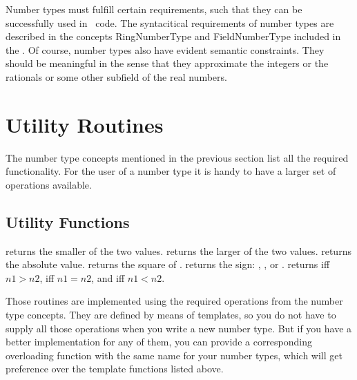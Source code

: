 Number types must fulfill certain requirements, such that they can
be successfully used in \cgal\ code.  The syntacitical requirements of
number types are described in
the concepts RingNumberType and FieldNumberType included in the 
.
Of course, number types also
have evident semantic constraints. They should be meaningful in the
sense that they approximate the integers or the rationals 
or some other subfield of the real numbers.

\section{Utility Routines}

The number type concepts mentioned in the previous section list all 
the required functionality.
For the user of a number type it is handy to have a larger set of
operations available.

\subsection{Utility Functions}


{returns the smaller of the two values.}
\ccGlue
{}
{returns the larger of the two values.}
\ccGlue
{}
{returns the absolute value.}
\ccGlue
{}
{returns the square of .}
\ccGlue
{}
{returns the sign: , , or .}
\ccGlue
{}
{}
\ccGlue
{}
{}
\ccGlue
{}
{}
\ccGlue
{}
{}
\ccGlue
{}
{returns  iff $n1>n2$,  iff $n1=n2$, and  iff $n1<n2$.}

Those routines are implemented using the required operations from the
number type concepts. They are defined by means of templates, so you do not
have to supply all those operations when you write  a new number type.
But if you have a better implementation for any of them, you can provide a 
corresponding overloading function with the same name for your number types,
which will get preference over the template functions listed above.

